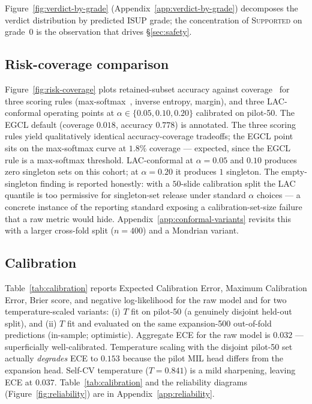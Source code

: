 \documentclass{article}
\newcommand{\SafeNum}[1]{#1}
\begin{document}
Figure~\ref{fig:verdict-by-grade} (Appendix~\ref{app:verdict-by-grade}) decomposes the verdict distribution by predicted ISUP grade; the concentration of \textsc{Supported} on grade~$\SafeNum{0}$ is the observation that drives \S\ref{sec:safety}.

\subsection{Risk-coverage comparison}
\label{sec:risk-coverage}

Figure~\ref{fig:risk-coverage} plots retained-subset accuracy against coverage~\citep{jaeger2023failure} for three scoring rules (max-softmax~\citep{hendrycks2017msp}, inverse entropy, margin), and three LAC-conformal operating points at $\alpha \in \{\SafeNum{0.05}, \SafeNum{0.10}, \SafeNum{0.20}\}$ calibrated on pilot-50. The EGCL default (coverage $\SafeNum{0.018}$, accuracy $\SafeNum{0.778}$) is annotated. The three scoring rules yield qualitatively identical accuracy-coverage tradeoffs; the EGCL point sits on the max-softmax curve at $\SafeNum{1.8}\%$ coverage --- expected, since the EGCL rule is a max-softmax threshold. LAC-conformal at $\alpha=\SafeNum{0.05}$ and $\SafeNum{0.10}$ produces zero singleton sets on this cohort; at $\alpha=\SafeNum{0.20}$ it produces $\SafeNum{1}$ singleton. The empty-singleton finding is reported honestly: with a $\SafeNum{50}$-slide calibration split the LAC quantile is too permissive for singleton-set release under standard $\alpha$ choices --- a concrete instance of the reporting standard exposing a calibration-set-size failure that a raw metric would hide. Appendix~\ref{app:conformal-variants} revisits this with a larger cross-fold split ($n{=}\SafeNum{400}$) and a Mondrian variant.


\subsection{Calibration}
\label{sec:calibration}

Table~\ref{tab:calibration} reports Expected Calibration Error, Maximum Calibration Error, Brier score, and negative log-likelihood for the raw model and for two temperature-scaled variants: (i) $T$ fit on pilot-50 (a genuinely disjoint held-out split), and (ii) $T$ fit and evaluated on the same expansion-500 out-of-fold predictions (in-sample; optimistic). Aggregate ECE for the raw model is $\SafeNum{0.032}$ --- superficially well-calibrated. Temperature scaling with the disjoint pilot-50 set actually \emph{degrades} ECE to $\SafeNum{0.153}$ because the pilot MIL head differs from the expansion head. Self-CV temperature ($T=\SafeNum{0.841}$) is a mild sharpening, leaving ECE at $\SafeNum{0.037}$. Table~\ref{tab:calibration} and the reliability diagrams (Figure~\ref{fig:reliability}) are in Appendix~\ref{app:reliability}.
\end{document}
